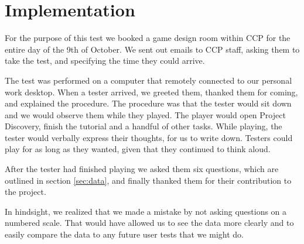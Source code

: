 \section{Implementation}\label{sec:implementation}
For the purpose of this test we booked a game design room within CCP for the entire day of the 9th of October. We sent out emails to CCP staff, asking them to take the test, and specifying the time they could arrive.

The test was performed on a computer that remotely connected to our personal work desktop. When a tester arrived, we greeted them, thanked them for coming, and explained the procedure. The procedure was that the tester would sit down and we would observe them while they played. The player would open Project Discovery, finish the tutorial and a handful of other tasks. While playing, the tester would verbally express their thoughts, for us to write down. Testers could play for as long as they wanted, given that they continued to think aloud.

After the tester had finished playing we asked them six questions, which are outlined in section \ref{sec:data}, and finally thanked them for their contribution to the project.

In hindsight, we realized that we made a mistake by not asking questions on a numbered scale. That would have allowed us to see the data more clearly and to easily compare the data to any future user tests that we might do.
